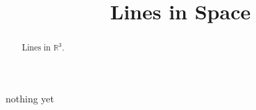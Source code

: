 \documentclass{ximera}
\title{Lines in Space}
\begin{document}
\begin{abstract}
Lines in $\mathbb{R}^3$.
\end{abstract}
\maketitle

nothing yet
\end{document}
